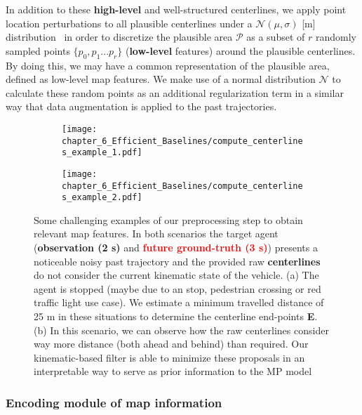 In addition to these \textbf{high-level} and well-structured centerlines, we apply point location perturbations to all plausible centerlines under a $\mathcal{N}(\mu, \sigma)$ [m] distribution~\cite{ye2021tpcn} in order to discretize the plausible area $\mathcal{P}$ as a subset of $r$ randomly sampled points $\{p_0 , p_1 ... p_r\}$ (\textbf{low-level} features) around the plausible centerlines. By doing this, we may have a common representation of the plausible area, defined as low-level map features. We make use of a normal distribution $\mathcal{N}$ to calculate these random points as an additional regularization term in a similar way that data augmentation is applied to the past trajectories. 

\begin{figure}[t!]
	\begin{subfigure}{0.5\textwidth}
		\texttt{[image: chapter\_6\_Efficient\_Baselines/compute\_centerlines\_example\_1.pdf]}
		
	\end{subfigure}
	\hfill
	\begin{subfigure}{0.5\textwidth}
		\texttt{[image: chapter\_6\_Efficient\_Baselines/compute\_centerlines\_example\_2.pdf]}
		
	\end{subfigure}
	
	\captionsetup{justification=justified}
	\caption[Some challenging examples of our preprocessing step to obtain relevant map features]{Some challenging examples of our preprocessing step to obtain relevant map features. In both scenarios the target agent (\textbf{\textcolor{YellowOrange}{observation (2 s)}} and \textbf{\textcolor{red}{future ground-truth (3 s)}}) presents a noticeable noisy past trajectory and the provided raw \textbf{centerlines} do not consider the current kinematic state of the vehicle. (a) The agent is stopped (maybe due to an stop, pedestrian crossing or red traffic light use case). We estimate a minimum travelled distance of 25 m in these situations to determine the centerline end-points \textbf{E}. (b) In this scenario, we can observe how the raw centerlines consider way more distance (both ahead and behind) than required. Our kinematic-based filter is able to minimize these proposals in an interpretable way to serve as prior information to the MP model
	}
	\label{fig:chapter_6_Efficient_Baselines/efficient_baselines_hdmap_filtered_examples}
\end{figure}

\subsubsection{Encoding module of map information}
\label{subsubsec:6_efficient_baselines_encoding_map}

